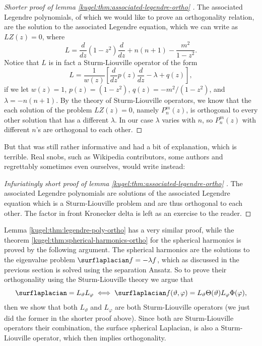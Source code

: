 \begin{proof}[
    Shorter proof of lemma \ref{kugel:thm:associated-legendre-ortho}
  ]
  The associated Legendre polynomials, of which we would like to prove an
  orthogonality relation, are the solution to the associated Legendre equation,
  which we can write as $LZ(z) = 0$, where
  \begin{equation*}
    L = \frac{d}{dz} (1 - z^2) \frac{d}{dz}
      + n(n+1) - \frac{m^2}{1 - z^2}.
  \end{equation*}
  Notice that $L$ is in fact a Sturm-Liouville operator of the form
  \begin{equation*}
    L = \frac{1}{w(z)} \left[
        \frac{d}{dz} p(z) \frac{d}{dz} - \lambda + q(z)
      \right],
  \end{equation*}
  if we let $w(z) = 1$, $p(z) = (1 - z^2 )$, $q(z) = -m^2 / (1 - z^2)$, and
  $\lambda = -n(n+1)$. By the theory of Sturm-Liouville operators, we know that
  the each solution of the problem $LZ(z) = 0$, namely $P^m_n(z)$, is orthogonal
  to every other solution that has a different $\lambda$. In our case $\lambda$
  varies with $n$, so $P^m_n(z)$ with different $n$'s are orthogonal to each
  other.
\end{proof}

But that was still rather informative and had a bit of explanation, which is
terrible. Real snobs, such as Wikipedia contributors, some authors and
regrettably sometimes even ourselves, would write instead:

\begin{proof}[
    Infuriatingly short proof of lemma \ref{kugel:thm:associated-legendre-ortho}
  ]
  The associated Legendre polynomials are solutions of the associated Legendre
  equation which is a Sturm-Liouville problem and are thus orthogonal to each
  other. The factor in front Kronecker delta is left as an exercise to the
  reader.
\end{proof}

Lemma \ref{kugel:thm:legendre-poly-ortho} has a very similar proof, while the theorem \ref{kugel:thm:spherical-harmonics-ortho} for the spherical harmonics is proved by the following argument. 
The spherical harmonics are the solutions to the eigenvalue problem $\surflaplacian f = -\lambda f$,
which as discussed in the previous section is solved using the separation Ansatz. So to
prove their orthogonality using the Sturm-Liouville theory we argue that
\begin{equation*}
  \surflaplacian = L_\vartheta L_\varphi \iff
  \surflaplacian f(\vartheta, \varphi)
    = L_\vartheta \Theta(\vartheta) L_\varphi \Phi(\varphi),
\end{equation*}
then we show that both $L_\vartheta$ and $L_\varphi$ are both Sturm-Liouville
operators (we just did the former in the shorter proof above). Since both are
Sturm-Liouville operators their combination, the surface spherical Laplacian, is
also a Sturm-Liouville operator, which then implies orthogonality.

